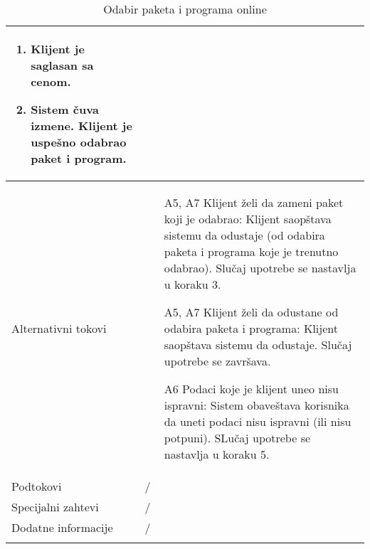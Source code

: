 \documentclass[../main.tex]{subfiles}
\begin{document}
\begin{longtable}{| p{} | p{} |}
\begin{enumerate}
        \item Klijent je saglasan sa cenom.
        \item Sistem čuva izmene. Klijent je uspešno odabrao paket i program.
    \end{enumerate}\\
\hline
    Alternativni tokovi & \begin{itemize}
        \item[A5, A7] Klijent želi da zameni paket koji je odabrao: Klijent saopštava sistemu da odustaje (od odabira paketa i programa koje je trenutno odabrao). Slučaj upotrebe se nastavlja u koraku 3.
        \item [A5, A7] Klijent želi da odustane od odabira paketa i programa: Klijent saopštava sistemu da odustaje. Slučaj upotrebe se završava.
        \item [A6] Podaci koje je klijent uneo nisu ispravni: Sistem obaveštava korisnika da uneti podaci nisu ispravni (ili nisu potpuni). SLučaj upotrebe se nastavlja u koraku 5.
    \end{itemize}\\
\hline
    Podtokovi & /\\
\hline
    Specijalni zahtevi & /\\
\hline
    Dodatne informacije & /\\
\hline
\caption{Odabir paketa i programa online} %
\end{longtable}
\end{document}
